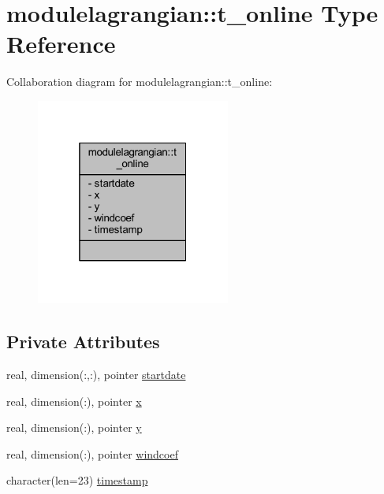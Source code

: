 \hypertarget{structmodulelagrangian_1_1t__online}{}\section{modulelagrangian\+:\+:t\+\_\+online Type Reference}
\label{structmodulelagrangian_1_1t__online}


Collaboration diagram for modulelagrangian\+:\+:t\+\_\+online\+:\nopagebreak
\begin{figure}[H]
\begin{center}
\leavevmode
\includegraphics[width=181pt]{structmodulelagrangian_1_1t__online__coll__graph}
\end{center}
\end{figure}
\subsection*{Private Attributes}
\begin{DoxyCompactItemize}
\item 
real, dimension(\+:,\+:), pointer \mbox{\hyperlink{structmodulelagrangian_1_1t__online_a7e972e7d45bfed575248a1ee0a543ba7}{startdate}}
\item 
real, dimension(\+:), pointer \mbox{\hyperlink{structmodulelagrangian_1_1t__online_a946824459e1720f1f6274ebc1fcff3e0}{x}}
\item 
real, dimension(\+:), pointer \mbox{\hyperlink{structmodulelagrangian_1_1t__online_a9cf18692f708a30e770df6b1f1e1dfcb}{y}}
\item 
real, dimension(\+:), pointer \mbox{\hyperlink{structmodulelagrangian_1_1t__online_aa79d3c3232528c3c6e37b899350b9814}{windcoef}}
\item 
character(len=23) \mbox{\hyperlink{structmodulelagrangian_1_1t__online_aa0d129a2a12f0317a7dd039d2da00bd6}{timestamp}}
\end{DoxyCompactItemize}


